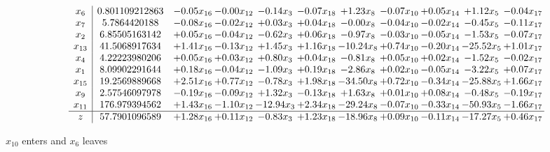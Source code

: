 \documentclass[9pt]{article}
\begin{document}
 \[\begin{array}{c| c c@{\hskip 2pt} c@{\hskip 2pt} c@{\hskip 2pt} c@{\hskip 2pt} c@{\hskip 2pt} c@{\hskip 2pt} c@{\hskip 2pt} c@{\hskip 2pt} c@{\hskip 2pt} }
 x_{6}   &  0.801109212863 & -0.05 x_{16} & -0.00 x_{12} & -0.14 x_{3} & -0.07 x_{18} & +  1.23 x_{8} & -0.07 x_{10} & +  0.05 x_{14} & +  1.12 x_{5} & -0.04 x_{17}\\
 x_{7}   &  5.7864420188 & -0.08 x_{16} & -0.02 x_{12} & +  0.03 x_{3} & +  0.04 x_{18} & -0.00 x_{8} & -0.04 x_{10} & -0.02 x_{14} & -0.45 x_{5} & -0.11 x_{17}\\
 x_{2}   &  6.85505163142 & +  0.05 x_{16} & -0.04 x_{12} & -0.62 x_{3} & +  0.06 x_{18} & -0.97 x_{8} & -0.03 x_{10} & -0.05 x_{14} & -1.53 x_{5} & -0.07 x_{17}\\
 x_{13}   &  41.5068917634 & +  1.41 x_{16} & -0.13 x_{12} & +  1.45 x_{3} & +  1.16 x_{18} & -10.24 x_{8} & +  0.74 x_{10} & -0.20 x_{14} & -25.52 x_{5} & +  1.01 x_{17}\\
 x_{4}   &  4.22223980206 & +  0.05 x_{16} & +  0.03 x_{12} & +  0.80 x_{3} & +  0.04 x_{18} & -0.81 x_{8} & +  0.05 x_{10} & +  0.02 x_{14} & -1.52 x_{5} & -0.02 x_{17}\\
 x_{1}   &  8.09902291644 & +  0.18 x_{16} & -0.04 x_{12} & -1.09 x_{3} & +  0.19 x_{18} & -2.86 x_{8} & +  0.02 x_{10} & -0.05 x_{14} & -3.22 x_{5} & +  0.07 x_{17}\\
 x_{15}   &  19.2569889668 & +  2.51 x_{16} & +  0.77 x_{12} & -0.78 x_{3} & +  1.98 x_{18} & -34.50 x_{8} & +  0.72 x_{10} & -0.34 x_{14} & -25.88 x_{5} & +  1.66 x_{17}\\
 x_{9}   &  2.57546097978 & -0.19 x_{16} & -0.09 x_{12} & +  1.32 x_{3} & -0.13 x_{18} & +  1.63 x_{8} & +  0.01 x_{10} & +  0.08 x_{14} & -0.48 x_{5} & -0.19 x_{17}\\
 x_{11}   &  176.979394562 & +  1.43 x_{16} & -1.10 x_{12} & -12.94 x_{3} & +  2.34 x_{18} & -29.24 x_{8} & -0.07 x_{10} & -0.33 x_{14} & -50.93 x_{5} & -1.66 x_{17}\\
\hline
z    &  57.7901096589 & +  1.28 x_{16} & +  0.11 x_{12} & -0.83 x_{3} & +  1.23 x_{18} & -18.96 x_{8} & +  0.09 x_{10} & -0.11 x_{14} & -17.27 x_{5} & +  0.46 x_{17}\\
\end{array}\]


 $ x_{10} $ enters and $ x_{6} $ leaves 
\end{document}
